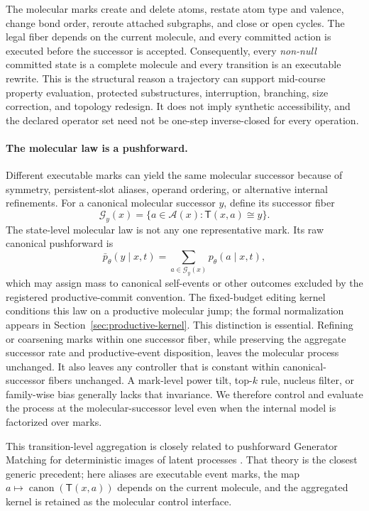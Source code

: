 \documentclass[10pt,letterpaper]{article}
\newcommand{\A}{\mathcal{A}}
\newcommand{\G}{\mathcal{G}}
\newcommand{\T}{\mathsf{T}}
\begin{document}
The molecular marks create and delete atoms, restate atom type and valence,
change bond order, reroute attached subgraphs, and close or open cycles. The
legal fiber depends on the current
molecule, and every committed action is executed before the successor is
accepted. Consequently, every \emph{non-null} committed state is a complete
molecule and every transition is an executable rewrite. This is the structural
reason a trajectory can support mid-course property evaluation, protected
substructures, interruption, branching, size correction, and topology
redesign. It does not imply synthetic accessibility, and the declared operator
set need not be one-step inverse-closed for every operation.

\paragraph{The molecular law is a pushforward.}
Different executable marks can yield the same molecular successor because of
symmetry, persistent-slot aliases, operand ordering, or alternative internal
refinements. For a canonical molecular successor $y$, define its successor
fiber
\[
  \G_y(x)=\{a\in\A(x):\T(x,a)\cong y\}.
\]
The state-level molecular law is not any one representative mark. Its raw
canonical pushforward is
\[
  \bar p_\theta(y\mid x,t)
  =
  \sum_{a\in\G_y(x)}p_\theta(a\mid x,t),
\]
which may assign mass to canonical self-events or other outcomes excluded by
the registered productive-commit convention. The fixed-budget editing kernel
conditions this law on a productive molecular jump; the formal normalization
appears in Section~\ref{sec:productive-kernel}. This distinction is essential.
Refining or coarsening marks within one successor fiber, while preserving the
aggregate successor rate and productive-event disposition, leaves the
molecular process unchanged. It also leaves any controller that is constant
within canonical-successor fibers unchanged. A mark-level power tilt, top-$k$
rule, nucleus filter, or family-wise bias generally lacks that invariance. We
therefore control and evaluate the process at the molecular-successor level
even when the internal model is factorized over marks.

This transition-level aggregation is closely related to pushforward Generator
Matching for deterministic images of latent processes
\citep{billera2026latent}. That theory is the closest generic precedent; here
aliases are executable event marks, the map
$a\mapsto\operatorname{canon}(\T(x,a))$ depends on the current molecule, and
the aggregated kernel is retained as the molecular control interface.
\end{document}
